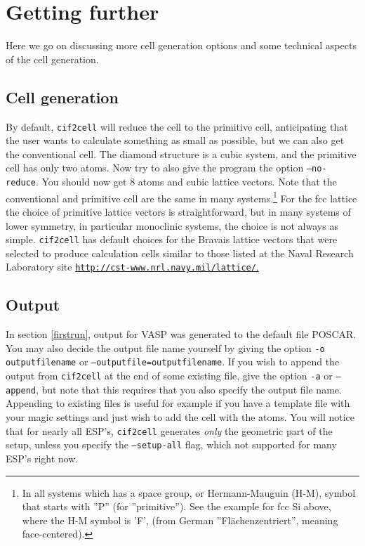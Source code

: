 \documentclass[11pt]{article}
\newcommand{\ciftocell}{\texttt{cif2cell}}
\begin{document}
\section{Getting further}
Here we go on discussing more cell generation options and some technical aspects of the cell generation.

\subsection{Cell generation}
By default, \ciftocell{} will reduce the cell to the primitive cell, anticipating that the user wants to calculate something as small as possible, but we can also get the conventional cell. The diamond structure is a cubic system, and the primitive cell has only two atoms. Now try to also give the program the option \texttt{--no-reduce}. You should now get 8 atoms and cubic lattice vectors. Note that the conventional and primitive cell are the same in many systems.\footnote{In all systems which has a space group, or Hermann-Mauguin (H-M), symbol that starts with ''P'' (for ''primitive''). See the example for fcc Si above, where the H-M symbol is 'F', (from German ''Fl\"achenzentriert'', meaning face-centered).}
For the fcc lattice the choice of primitive lattice vectors is straightforward, but in many systems of lower symmetry, in particular monoclinic systems, the choice is not always as simple. \ciftocell{} has default choices for the Bravais lattice vectors that were selected to produce calculation cells similar to those listed at the Naval Research Laboratory site \href{http://cst-www.nrl.navy.mil/lattice/}{\texttt{http://cst-www.nrl.navy.mil/lattice/}.}

\subsection{Output}

In section \ref{firstrun}, output for VASP was generated to the default file POSCAR. You may also decide the output file name yourself by giving the option \texttt{-o outputfilename} or \texttt{--outputfile=outputfilename}. If you wish to append the output from \ciftocell{} at the end of some existing file, give the option \texttt{-a} or \texttt{--append}, but note that this requires that you also specify the output file name. Appending to existing files is useful for example if you have a template file with your magic settings and just wish to add the cell with the atoms. You will notice that for nearly all ESP's, \ciftocell{} generates \emph{only} the geometric part of the setup, unless you specify the \texttt{--setup-all} flag, which not supported for many ESP's right now. 
\end{document}
